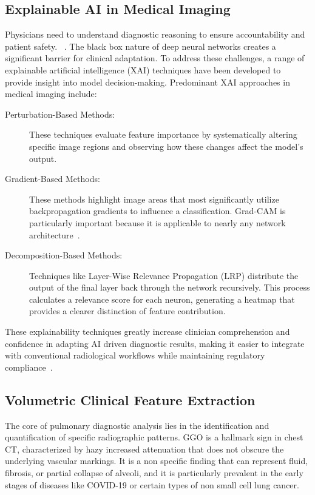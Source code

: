 \subsection{Explainable AI in Medical Imaging}
Physicians need to understand diagnostic reasoning to ensure accountability and patient safety. ~\cite{van2024unveiling}.
The black box nature of deep neural networks creates a significant barrier for clinical adaptation.
To address these challenges, a range of explainable artificial intelligence (XAI) techniques have been developed to provide insight
into model decision-making. Predominant XAI approaches in medical imaging include:
\begin{description}
    \item [Perturbation-Based Methods:] These techniques evaluate feature importance by systematically altering specific image regions
    and observing how these changes affect the model's output\cite{bhati2024survey}.
    \item [Gradient-Based Methods:] These methods highlight image areas that most significantly utilize backpropagation gradients to
    influence a classification. Grad-CAM is particularly important because it is applicable to nearly any network architecture~\cite{bhati2024survey}\cite{singh2024explainable}.
    \item [Decomposition-Based Methods:] Techniques like Layer-Wise Relevance Propagation (LRP) distribute the output of the final
    layer back through the network recursively. This process calculates a relevance score for each neuron, generating a heatmap
    that provides a clearer distinction of feature contribution\cite{bhati2024survey}.
\end{description}

These explainability techniques greatly increase clinician comprehension and confidence in adapting AI driven diagnostic results,
making it easier to integrate with conventional radiological workflows while maintaining regulatory compliance~\cite{singh2024explainable}.

\subsection{Volumetric Clinical Feature Extraction}
The core of pulmonary diagnostic analysis lies in the identification and quantification of specific radiographic patterns. GGO is a hallmark
sign in chest CT, characterized by hazy increased attenuation that does not obscure the underlying vascular markings. It is a non specific
finding that can represent fluid, fibrosis, or partial collapse of alveoli, and it is particularly prevalent in the early stages of diseases
like COVID-19 or certain types of non small cell lung cancer.

